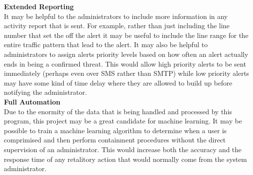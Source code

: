 \documentclass[12pt]{report}
\begin{document}
	\noindent
	\textbf{Extended Reporting} \\
	It may be helpful to the administrators to include more information
	in any activity report that is sent. For example, rather than just including
	the line number that set the off the alert it may be useful to include the 
	line range for the entire traffic pattern that lead to the alert. It may also
	be helpful to administrators to assign alerts priority levels based on how 
	often an alert actually ends in being a confirmed threat. This would allow
	high priority alerts to be sent immediately (perhaps even over SMS rather than
	SMTP) while low priority alerts may have some kind of time delay where they
	are allowed to build up before notifying the administrator. \\

	\noindent
	\textbf{Full Automation} \\
	Due to the enormity of the data that is being handled and processed by this
	program, this project may be a great candidate for machine learning. It may
	be possible to train a machine learning algorithm to determine when a user
	is comprimised and then perform containment procedures without the direct 
	supervision of an administrator. This would increase both the accuracy and
	the response time of any retalitory action that would normally come from
	the system administrator. \\
\end{document}
